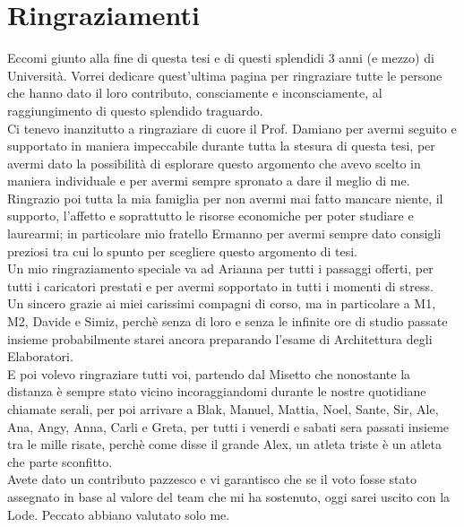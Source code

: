 \documentclass[12pt,a4paper,twoside,openright]{extreport}
\begin{document}
    
    \cleardoublepage
    
    \cleardoublepage
    
    \cleardoublepage
    
    \cleardoublepage
    
    \cleardoublepage
    
    \cleardoublepage
    \printbibliography[heading=bibintoc]
    \cleardoublepage
    \chapter*{Ringraziamenti}
    Eccomi giunto alla fine di questa tesi e di questi splendidi 3 anni (e mezzo) di Università. Vorrei dedicare quest'ultima pagina per ringraziare tutte le persone che hanno dato il loro contributo, consciamente e inconsciamente, al raggiungimento di questo splendido traguardo.
    \\Ci tenevo inanzitutto a ringraziare di cuore il Prof. Damiano per avermi seguito e supportato in maniera impeccabile durante tutta la stesura di questa tesi, per avermi dato la possibilità di esplorare questo argomento che avevo scelto in maniera individuale e per avermi sempre spronato a dare il meglio di me. 
    \\Ringrazio poi tutta la mia famiglia per non avermi mai fatto mancare niente, il supporto, l'affetto e soprattutto le risorse economiche per poter studiare e laurearmi; in particolare mio fratello Ermanno per avermi sempre dato consigli preziosi tra cui lo spunto per scegliere questo argomento di tesi.
    \\Un mio ringraziamento speciale va ad Arianna per tutti i passaggi offerti, per tutti i caricatori prestati e per avermi sopportato in tutti i momenti di stress.
    \\Un sincero grazie ai miei carissimi compagni di corso, ma in particolare a M1, M2, Davide e Simiz, perchè senza di loro e senza le infinite ore di studio passate insieme probabilmente starei ancora preparando l'esame di Architettura degli Elaboratori.
    \\E poi volevo ringraziare tutti voi, partendo dal Misetto che nonostante la distanza è sempre stato vicino incoraggiandomi durante le nostre quotidiane chiamate serali, per poi arrivare a Blak, Manuel, Mattia, Noel, Sante, Sir, Ale, Ana, Angy, Anna, Carli e Greta, per tutti i venerdi e sabati sera passati insieme tra le mille risate, perchè come disse il grande Alex, un atleta triste è un atleta che parte sconfitto.
    \\Avete dato un contributo pazzesco e vi garantisco che se il voto fosse stato assegnato in base al valore del team che mi ha sostenuto, oggi sarei uscito con la Lode. Peccato abbiano valutato solo me.    \cleardoublepage
\end{document}
